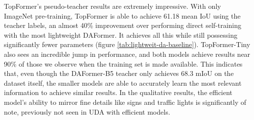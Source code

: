 \documentclass[a4paper,12pt]{report}
\begin{document}
TopFormer's pseudo-teacher results are extremely impressive. With only ImageNet pre-training, TopFormer is able to achieve 61.18 mean IoU using the teacher labels, an almost 40\% improvement over performing direct self-training with the most lightweight DAFormer. It achieves all this while still possessing significantly fewer parameters (figure \ref{tab:lightweit-da-baseline}). TopFormer-Tiny also sees an incredible jump in performance, and both models achieve results near 90\% of those we observe when the training set is made available. This indicates that, even though the DAFormer-B5 teacher only achieves 68.3 mIoU on the dataset itself, the smaller models are able to accurately learn the most relevant information to achieve similar results. In the qualitative results, the efficient model's ability to mirror fine details like signs and traffic lights is significantly of note, previously not seen in UDA with efficient models.
\end{document}

